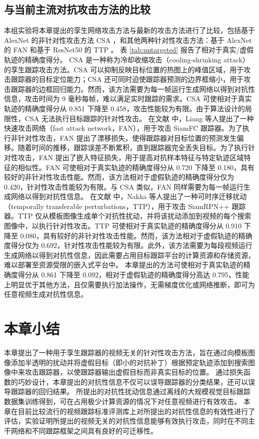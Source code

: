 \subsection{与当前主流对抗攻击方法的比较}

本组实验将本章提出的孪生网络攻击方法与最新的攻击方法进行了比较，包括基于 AlexNet 的非针对性攻击方法 CSA \cite{CSA}，和其他两种针对性攻击方法：基于 AlexNet 的 FAN \cite{FAN} 和基于 ResNet50 的 TTP \cite{TTP}。
表 \ref{tab:untargeted} 报告了相对于真实/虚假轨迹的精确度得分。
CSA \cite{CSA} 是一种称为冷却收缩攻击（cooling-shrinking attack）的孪生跟踪攻击方法。CSA 可以抑制反映目标位置的热图上的峰值区域，用于攻击跟踪器的目标定位能力；CSA 还可同时迫使跟踪器预测的边界框缩小，用于攻击跟踪器的边框回归能力。然而，该方法需要为每一帧运行生成网络以得到对抗性信息，攻击时间为 9 毫秒每帧，难以满足实时跟踪的需求。CSA 可使相对于真实轨迹的精确度得分从 0.851 下降至 0.458，攻击性能较为有限。由于算法设计的局限性，CSA 无法执行目标跟踪的针对性攻击。
在文献 \cite{FAN} 中，Liang 等人提出了一种快速攻击网络（fast attack network，FAN），用于攻击 SiamFC 跟踪器。为了执行非针对性攻击，FAN 提出了漂移损失，使得跟踪器对目标位置的预测发生偏移。随着时间的推移，跟踪误差不断累积，直到跟踪器完全丢失目标。为了执行针对性攻击，FAN 提出了嵌入特征损失，用于提高对抗样本特征与特定轨迹区域特征的相似性。FAN 可使相对于真实轨迹的精确度得分从 0.720 下降至 0.180，具有较好的非针对性攻击性能。然而，该方法相对于虚假轨迹的精确度得分仅为 0.420，针对性攻击性能较为有限。与 CSA 类似，FAN 同样需要为每一帧运行生成网络以得到对抗性信息。
在文献 \cite{TTP} 中，Nakka 等人提出了一种可时序迁移扰动（temporally transferable perturbations，TTP），用于攻击 SiamRPN++ 跟踪器。TTP 仅从模板图像生成单个对抗性扰动，并将该扰动添加到视频的每个搜索图像中，以执行针对性攻击。TTP 可使相对于真实轨迹的精确度得分从 0.910 下降至 0.080，具有较好的非针对性攻击性能。然而，该方法相对于虚假轨迹的精确度得分仅为 0.692，针对性攻击性能较为有限。此外，该方法需要为每段视频运行生成网络以得到对抗性信息，因此需要占用目标跟踪平台的计算资源和存储资源，难以部署至资源受限的嵌入式平台中。
本章提出的方法可使相对于真实轨迹的精确度得分从 0.861 下降至 0.092，相对于虚假轨迹的精确度得分高达 0.795，性能上明显优于其他方法，且仅需要执行加法操作，无需梯度优化或网络推断，即可为任意视频生成对抗性信息。

\section{本章小结}

本章提出了一种用于孪生跟踪器的视频无关的针对性攻击方法，旨在通过向模板图像添加半透明的扰动并将虚假目标（即小的对抗补丁）根据预定轨迹添加到搜索图像中来攻击跟踪器，以使跟踪器输出虚假目标而非真实目标的位置。
通过损失函数的巧妙设计，本章提出的对抗性信息不仅可以误导跟踪器的分类结果，还可以误导跟踪器的回归结果。
所提出的对抗性扰动信息通过离线的大规模视觉目标跟踪数据集训练得到，可在占用极少计算资源的情况下对任意视频进行有效攻击。
本章在目前比较流行的视频跟踪标准评测库上对所提出的对抗性信息的有效性进行了评估，实验证明所提出的视频无关的对抗性信息能够有效执行攻击，同时在不同主干网络和不同跟踪框架之间具有良好的可迁移性。